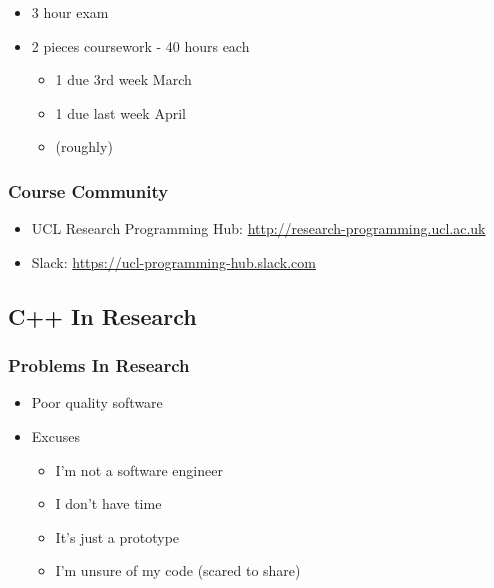 \begin{itemize}
\itemsep1pt\parskip0pt
\item
  3 hour exam
\item
  2 pieces coursework - 40 hours each

  \begin{itemize}
  \itemsep1pt\parskip0pt
  \item
    1 due 3rd week March
  \item
    1 due last week April
  \item
    (roughly)
  \end{itemize}
\end{itemize}

\subsubsection{Course Community}\label{course-community}

\begin{itemize}
\itemsep1pt\parskip0pt
\item
  UCL Research Programming Hub:
  \href{http://research-programming.ucl.ac.uk/}{http://research-programming.ucl.ac.uk}
\item
  Slack:
  \href{https://ucl-programming-hub.slack.com/}{https://ucl-programming-hub.slack.com}
\end{itemize}

\subsection{C++ In Research}\label{c-in-research}

\subsubsection{Problems In Research}\label{problems-in-research}

\begin{itemize}
\itemsep1pt\parskip0pt
\item
  Poor quality software
\item
  Excuses

  \begin{itemize}
  \itemsep1pt\parskip0pt
  \item
    I'm not a software engineer
  \item
    I don't have time
  \item
    It's just a prototype
  \item
    I'm unsure of my code (scared to share)
  \end{itemize}
\end{itemize}

